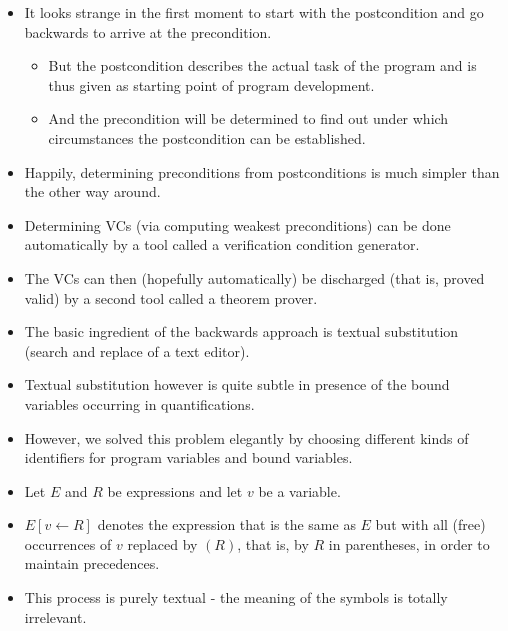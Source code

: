 \begin{multicols}{2}
\begin{itemize}
  \item It looks strange in the first moment to start with the postcondition and go backwards to arrive at the precondition.
  \begin{itemize}
    \item But the postcondition describes the actual task of the program and is thus given as starting point of program development.
    \item And the precondition will be determined to find out under which circumstances the postcondition can be established.
  \end{itemize}
  \item Happily, determining preconditions from postconditions is much simpler than the other way around.
\end{itemize}

\begin{itemize}
  \item Determining VCs (via computing weakest preconditions) can be done automatically by a tool called a verification condition generator.
  \item The VCs can then (hopefully automatically) be discharged (that is, proved valid) by a second tool called a theorem prover.
\end{itemize}

\begin{itemize}
  \item The basic ingredient of the backwards approach is textual substitution (search and replace of a text editor).
  \item Textual substitution however is quite subtle in presence of the bound variables occurring in quantifications.
  \item However, we solved this problem elegantly by choosing different kinds of identifiers for program variables and bound variables.
\end{itemize}

\begin{itemize}
  \item Let $E$ and $R$ be expressions and let $v$ be a variable.
  \item $E[v \leftarrow R]$ denotes the expression that is the same as $E$ but with all (free) occurrences of $v$ replaced by $\left(R\right)$, that is, by $R$ in parentheses, in order to maintain precedences.
  \item This process is purely textual - the meaning of the symbols is totally irrelevant.
\end{itemize}


\end{multicols}

